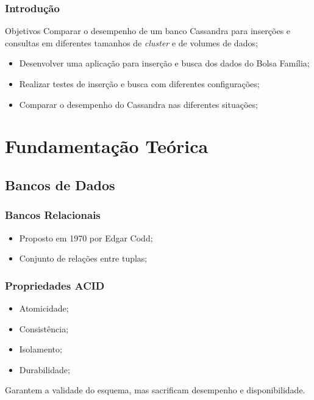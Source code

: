 \documentclass[brazil]{beamer}
\begin{document}
\begin{frame}
\frametitle{Introdução}

\begin{block}{Objetivos}
	Comparar o desempenho de um banco Cassandra para inserções e consultas em diferentes tamanhos de \emph{cluster} e de volumes de dados;
	
	\begin{itemize}
		\item Desenvolver uma aplicação para inserção e busca dos dados do Bolsa Família;
		\item Realizar testes de inserção e busca com diferentes configurações;
		\item Comparar o desempenho do Cassandra nas diferentes situações;
	\end{itemize}
\end{block}
\end{frame}

\section{Fundamentação Teórica}




\subsection{Bancos de Dados}

\begin{frame}
\frametitle{Bancos Relacionais}
	\begin{itemize}
		\item Proposto em 1970 por Edgar Codd;
		\item Conjunto de relações entre tuplas;
	\end{itemize}
\end{frame}

\begin{frame}
\frametitle{Propriedades ACID}
	\begin{itemize}
		\item Atomicidade;
		\item Consistência;
		\item Isolamento;
		\item Durabilidade;
	\end{itemize}
	Garantem a validade do esquema, mas sacrificam desempenho e disponibilidade.
\end{frame}
\end{document}
